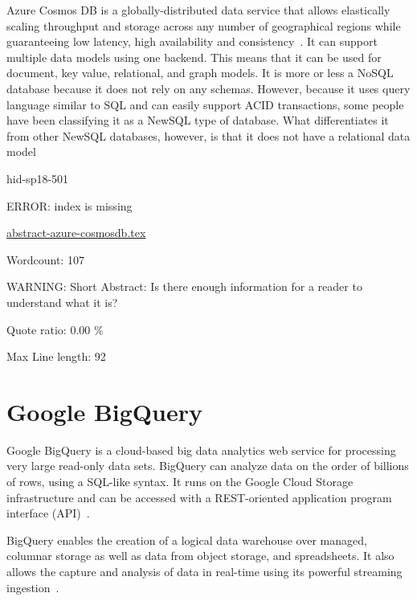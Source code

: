 Azure Cosmos DB is a globally-distributed data service that allows elastically
scaling throughput and storage across any number of geographical regions while
guaranteeing low latency, high availability and consistency~\cite{hid-sp18-501-CosmosDB}. It
can support multiple data models using one backend. This means that it can be
used for document, key value, relational, and graph models. It is more or less a
NoSQL database because it does not rely on any schemas. However, because it uses
query language similar to SQL and can easily support ACID transactions, some
people have been classifying it as a NewSQL type of database. What
differentiates it from other NewSQL databases, however, is that it does not have
a relational data model~\cite{hid-sp18-501-Stackify}



\begin{IU}

hid-sp18-501

ERROR: index is missing

\href{https://github.com/cloudmesh-community/hid-sp18-501/blob/master//technology/abstract-azure-cosmosdb.tex}{abstract-azure-cosmosdb.tex}

 

Wordcount: 107

WARNING: Short Abstract: Is there enough information for a reader to understand what it is?


Quote ratio: 0.00 \%
 
Max Line length: 92
\end{IU}

\section{Google BigQuery}

Google BigQuery is a cloud-based big data analytics web service for processing
very large read-only data sets. BigQuery can analyze data on the order of
billions of rows, using a SQL-like syntax. It runs on the Google Cloud Storage
infrastructure and can be accessed with a REST-oriented application program
interface (API)~\cite{hid-sp18-501-TechTarget}.

BigQuery enables the creation of a logical data warehouse over managed, columnar
storage as well as data from object storage, and spreadsheets. It also allows
the capture and analysis of data in real-time using its powerful streaming
ingestion~\cite{hid-sp18-501-GoogleCP_BQ}.




